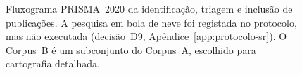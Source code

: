 \begin{figure}[htbp]
  \caption[Fluxograma PRISMA 2020 da seleção de publicações]{Fluxograma
  PRISMA~2020 da identificação, triagem e inclusão de publicações.
  A pesquisa em bola de neve foi registada no protocolo, mas não executada
  (decisão~D9, Apêndice~\ref{app:protocolo-sr}). O Corpus~B é um subconjunto
  do Corpus~A, escolhido para cartografia detalhada.
  }
  \label{fig:prisma}
\end{figure}
